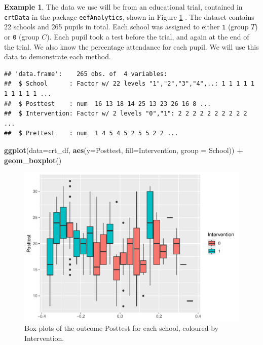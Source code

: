 \documentclass[
  openany]{book}
\newenvironment{Shaded}{\begin{snugshade}}{\end{snugshade}}
\newcommand{\AttributeTok}[1]{\textcolor[rgb]{0.13,0.29,0.53}{#1}}
\newcommand{\FunctionTok}[1]{\textcolor[rgb]{0.13,0.29,0.53}{\textbf{#1}}}
\newcommand{\NormalTok}[1]{#1}
\newcommand{\SpecialCharTok}[1]{\textcolor[rgb]{0.81,0.36,0.00}{\textbf{#1}}}
\theoremstyle{definition}
\theoremstyle{definition}
\newtheorem{example}{Example}[chapter]
\theoremstyle{definition}
\theoremstyle{definition}
\theoremstyle{remark}
\begin{document}
\begin{example}

The data we use will be from an educational trial, contained in \texttt{crtData} in the package \texttt{eefAnalytics}, shown in Figure \ref{fig:crtboxplots} . The dataset contains 22 schools and 265 pupils in total. Each school was assigned to either \texttt{1} (group \(T\)) or \texttt{0} (group \(C\)). Each pupil took a test before the trial, and again at the end of the trial. We also know the percentage attendance for each pupil. We will use this data to demonstrate each method.

\begin{verbatim}
## 'data.frame':    265 obs. of  4 variables:
##  $ School      : Factor w/ 22 levels "1","2","3","4",..: 1 1 1 1 1 1 1 1 1 1 ...
##  $ Posttest    : num  16 13 18 14 25 13 23 26 16 8 ...
##  $ Intervention: Factor w/ 2 levels "0","1": 2 2 2 2 2 2 2 2 2 2 ...
##  $ Prettest    : num  1 4 5 4 5 2 5 5 2 2 ...
\end{verbatim}

\begin{Shaded}
\begin{Highlighting}[]
\FunctionTok{ggplot}\NormalTok{(}\AttributeTok{data=}\NormalTok{crt\_df, }\FunctionTok{aes}\NormalTok{(}\AttributeTok{y=}\NormalTok{Posttest, }\AttributeTok{fill=}\NormalTok{Intervention, }\AttributeTok{group =}\NormalTok{ School)) }\SpecialCharTok{+} \FunctionTok{geom\_boxplot}\NormalTok{()}
\end{Highlighting}
\end{Shaded}

\begin{figure}
\centering
\includegraphics{CT4H_notes_files/figure-latex/crtboxplots-1.pdf}
\caption{\label{fig:crtboxplots}Box plots of the outcome Posttest for each school, coloured by Intervention.}
\end{figure}

\end{example}
\end{document}
